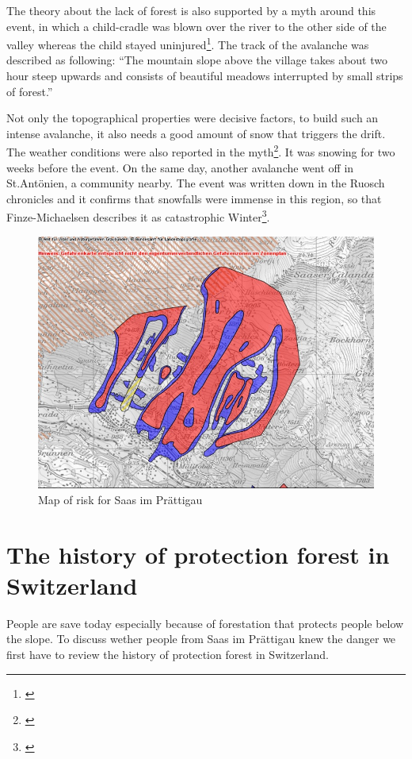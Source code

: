 \documentclass[12pt, a4paper]{article}
\begin{document}
The theory about the lack of forest is also supported by a myth around this event, in which a child-cradle was blown over 
the river to the other side of the valley whereas the child stayed uninjured\footnote{\citet[p.~53]{hansemann1995saaser}}. 
The track of the avalanche was described as following: ``The mountain slope above the village takes about two hour steep 
upwards and consists of beautiful meadows interrupted by small strips of forest.''

Not only the topographical properties were decisive factors, to build such an intense avalanche, it also needs a good amount 
of snow that triggers the drift. The weather conditions were also reported in the 
myth\footnote{\citet[p.~53]{hansemann1995saaser}}. It was snowing for two weeks before the event. On the same day, another 
avalanche went off in St.Antönien, a community nearby. The event was written down in the Ruosch chronicles and it confirms 
that snowfalls were immense in this region, so that Finze-Michaelsen describes it as catastrophic Winter\footnote{\citet[p.~18]{finze1988geschichte}}.  

\begin{figure}
\includegraphics[width=\textwidth,natwidth=610,natheight=642]{literature/gefahrenkarte.jpg}
\caption{Map of risk for Saas im Prättigau \citep{gefahrenkarte}}
\end{figure}

\section*{The history of protection forest in Switzerland}
People are save today especially because of forestation that protects people below the slope. To discuss wether people from 
Saas im Prättigau knew the danger we first have to review the history of protection forest in Switzerland.
\end{document}
